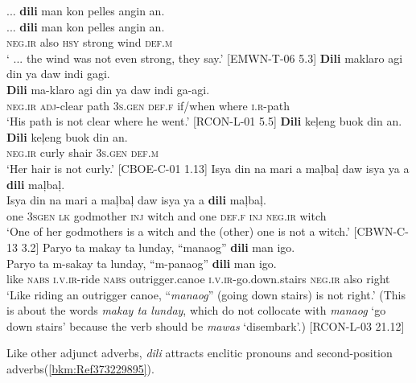 \ea
\label{bkm:Ref80941751}
{}... \textbf{dili}  man  kon  pelles  angin  an. \\\smallskip
\gll ... \textbf{dili}  man  kon  pelles  angin  an. \\
{} \textsc{neg.ir}  also  \textsc{hsy}  strong  wind  \textsc{def.m} \\
\glt ‘ ... the wind was not even strong, they say.’ [EMWN-T-06 5.3]
\z
\ea
\textbf{Dili}  maklaro  agi  din  ya  daw  indi  gagi. \\\smallskip
\gll \textbf{Dili}  ma-klaro  agi  din  ya  daw  indi  ga-agi. \\
\textsc{neg.ir}  \textsc{adj}-clear  path  3\textsc{s.gen}  \textsc{def.f}  if/when  where  \textsc{i.r}-path \\
\glt ‘His path is not clear where he went.’ [RCON-L-01 5.5]
\z
\ea
\label{bkm:Ref80941878}
\textbf{Dili}  keļeng  buok  din  an. \\\smallskip
\gll \textbf{Dili}  keļeng  buok  din  an. \\
\textsc{neg.ir}  curly  shair  3\textsc{s.gen}  \textsc{def.m} \\
\glt ‘Her hair is not curly.’  [CBOE-C-01 1.13]
\z
\ea
\label{bkm:Ref113700006}
Isya  din  na  mari  a  maļbaļ  daw  isya  ya  a  \textbf{dili}  maļbaļ. \\\smallskip
\gll Isya  din  na  mari  a  maļbaļ  daw  isya  ya  a  \textbf{dili}  maļbaļ. \\
one  \textsc{3sgen}  \textsc{lk}  godmother  \textsc{inj}  witch  and  one  \textsc{def.f}  \textsc{inj}  \textsc{neg.ir}  witch \\
\glt ‘One of her godmothers is a witch and the (other) one is not a witch.’ [CBWN-C-13 3.2]
\z
\ea
\label{bkm:Ref80941881}
Paryo  ta  makay  ta  lunday,  “manaog”  \textbf{dili}  man  igo. \\\smallskip
\gll Paryo  ta  m-sakay  ta  lunday,  “m-panaog” \textbf{dili}  man  igo. \\
like  \textsc{nabs}  \textsc{i.v.ir}-ride  \textsc{nabs}  outrigger.canoe  \textsc{i.v.ir}-go.down.stairs \textsc{neg.ir}  also  right \\
\glt ‘Like riding an outrigger canoe, “\textit{manaog}” (going down stairs) is not right.’ (This is about the words \textit{makay ta lunday}, which do not collocate with \textit{manaog} ‘go down stairs’ because the verb should be \textit{mawas} ‘disembark’.) [RCON-L-03 21.12] 
\z

Like other adjunct adverbs, \textit{dili} attracts enclitic pronouns  and second-position adverbs(\ref{bkm:Ref373229895}).


